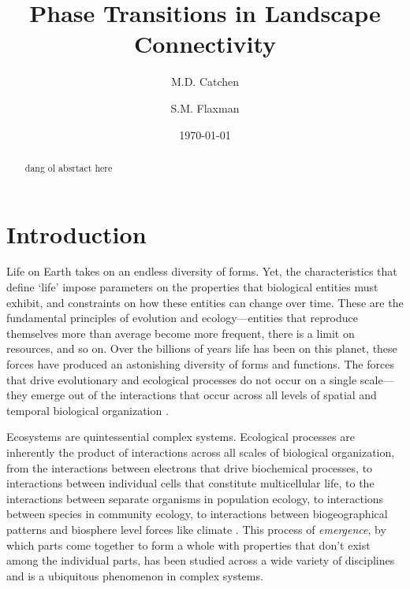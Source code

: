 \documentclass[]{article}
\title{Phase Transitions in Landscape Connectivity}
\author[1]{M.D. Catchen}
\author[2]{S.M. Flaxman}
\affil[1]{\small{Department of Ecology and Evolutionary Biology, University of Colorado at Boulder}}
\affil[2]{\small{Department of Biology, McGill University}}
\date{\today}
\begin{document}
\maketitle
\begin{abstract}

dang ol absrtact here

\end{abstract}
\clearpage

\section{Introduction}

Life on Earth takes on an endless diversity of forms.
Yet, the characteristics that define ‘life’ impose parameters on the properties that biological entities must exhibit, and constraints on how these entities can change over time.
These are the fundamental principles of evolution and ecology—entities that reproduce themselves more than average become more frequent, there is a limit on resources, and so on.
Over the billions of years life has been on this planet, these forces have produced an astonishing diversity of forms and functions.
The forces that drive evolutionary and ecological processes do not occur on a single scale---they emerge out of the interactions that occur across all levels of spatial and temporal biological organization \cite{levin_problem_1992}.

Ecosystems are quintessential complex systems.
Ecological processes are inherently the product of interactions across all scales of biological organization, from the interactions between electrons that drive biochemical processes, to interactions between individual cells that constitute multicellular life, to the interactions between separate organisms in population ecology, to interactions between species in community ecology, to interactions between biogeographical patterns and biosphere level forces like climate \cite{levin_problem_1992}.
This process of \textit{emergence}, by which parts come together to form a whole with properties that don't exist among the individual parts, has been studied across a wide variety of disciplines \cite{manrubia_emergence_2004)} and is a ubiquitous phenomenon in complex systems.
\end{document}
